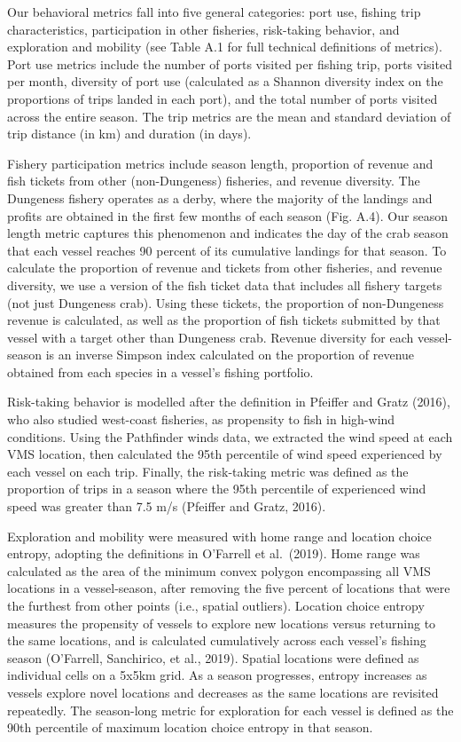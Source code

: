 \documentclass[]{elsarticle} %
\begin{document}
Our behavioral metrics fall into five general categories: port use,
fishing trip characteristics, participation in other fisheries,
risk-taking behavior, and exploration and mobility (see Table A.1 for
full technical definitions of metrics). Port use metrics include the
number of ports visited per fishing trip, ports visited per month,
diversity of port use (calculated as a Shannon diversity index on the
proportions of trips landed in each port), and the total number of ports
visited across the entire season. The trip metrics are the mean and
standard deviation of trip distance (in km) and duration (in days).

Fishery participation metrics include season length, proportion of
revenue and fish tickets from other (non-Dungeness) fisheries, and
revenue diversity. The Dungeness fishery operates as a derby, where the
majority of the landings and profits are obtained in the first few
months of each season (Fig. A.4). Our season length metric captures this
phenomenon and indicates the day of the crab season that each vessel
reaches 90 percent of its cumulative landings for that season. To
calculate the proportion of revenue and tickets from other fisheries,
and revenue diversity, we use a version of the fish ticket data that
includes all fishery targets (not just Dungeness crab). Using these
tickets, the proportion of non-Dungeness revenue is calculated, as well
as the proportion of fish tickets submitted by that vessel with a target
other than Dungeness crab. Revenue diversity for each vessel-season is
an inverse Simpson index calculated on the proportion of revenue
obtained from each species in a vessel's fishing portfolio.

Risk-taking behavior is modelled after the definition in Pfeiffer and
Gratz (2016), who also studied west-coast fisheries, as propensity to
fish in high-wind conditions. Using the Pathfinder winds data, we
extracted the wind speed at each VMS location, then calculated the 95th
percentile of wind speed experienced by each vessel on each trip.
Finally, the risk-taking metric was defined as the proportion of trips
in a season where the 95th percentile of experienced wind speed was
greater than 7.5 m/s (Pfeiffer and Gratz, 2016).

Exploration and mobility were measured with home range and location
choice entropy, adopting the definitions in O'Farrell et al.~(2019).
Home range was calculated as the area of the minimum convex polygon
encompassing all VMS locations in a vessel-season, after removing the
five percent of locations that were the furthest from other points
(i.e., spatial outliers). Location choice entropy measures the
propensity of vessels to explore new locations versus returning to the
same locations, and is calculated cumulatively across each vessel's
fishing season (O'Farrell, Sanchirico, et al., 2019). Spatial locations
were defined as individual cells on a 5x5km grid. As a season
progresses, entropy increases as vessels explore novel locations and
decreases as the same locations are revisited repeatedly. The
season-long metric for exploration for each vessel is defined as the
90th percentile of maximum location choice entropy in that season.
\end{document}
